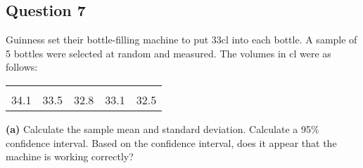 \documentclass[12pt]{article}
\begin{document}
\subsection*{Question 7}
Guinness set their bottle-filling machine to put 33cl into each bottle. A sample of 5 bottles were selected at random and measured. The volumes in cl were as follows:\\[-0.2cm]
\begin{center}
\begin{tabular}{|ccccc|}
\hline
&&&&\\[-0.3cm]
34.1  & 33.5 & 32.8 & 33.1 & 32.5\\[0.1cm]
\hline
\end{tabular}
\end{center}


{\bf(a)} Calculate the sample mean and standard deviation.  Calculate a 95\% confidence interval.   Based on the confidence interval, does it appear that the machine is working correctly?
\end{document}
